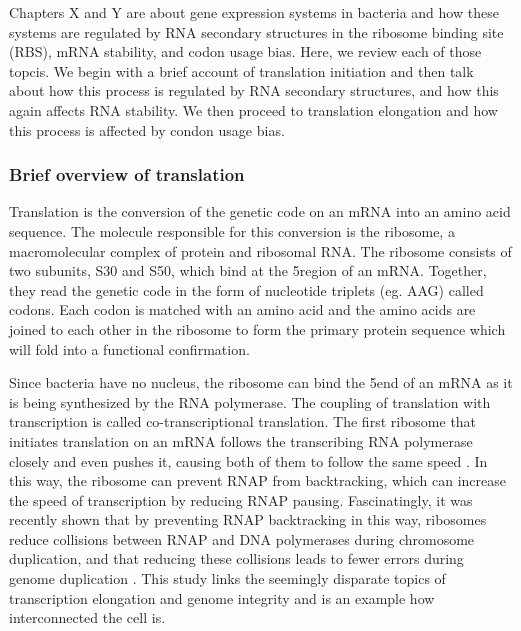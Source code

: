 %
Chapters X and Y are about gene expression systems in bacteria and how
these systems are regulated by RNA secondary structures in the ribosome binding
site (RBS), mRNA stability, and codon usage bias. Here, we review each of those
topcis. We begin with a brief account of translation initiation and then talk
about how this process is regulated by RNA secondary structures, and how this
again affects RNA stability. We then proceed to translation elongation and how
this process is affected by condon usage bias.

\subsubsection{Brief overview of translation}
Translation is the conversion of the genetic code on an mRNA into an amino acid
sequence. The molecule responsible for this conversion is the ribosome, a
macromolecular complex of protein and ribosomal RNA. The ribosome consists of
two subunits, S30 and S50, which bind at the 5\p region of an mRNA.
Together, they read the genetic code in the form of nucleotide triplets (eg.
AAG) called codons. Each codon is matched with an amino acid and the amino
acids are joined to each other in the ribosome to form the primary protein
sequence which will fold into a functional confirmation.

Since bacteria have no nucleus, the ribosome can bind the 5\p end of an mRNA as
it is being synthesized by the RNA polymerase. The coupling of translation with
transcription is called co-transcriptional translation. The first ribosome that
initiates translation on an mRNA follows the transcribing RNA polymerase
closely and even pushes it, causing both of them to follow the same speed
\cite{proshkin_cooperation_2010}. In this way, the ribosome can prevent RNAP
from backtracking, which can increase the speed of transcription by reducing
RNAP pausing. Fascinatingly, it was recently shown that by preventing RNAP
backtracking in this way, ribosomes reduce collisions between RNAP and DNA
polymerases during chromosome duplication, and that reducing these
collisions leads to fewer errors during genome duplication
\cite{dutta_linking_2011}. This study links the seemingly disparate topics of
transcription elongation and genome integrity and is an example how
interconnected the cell is.

